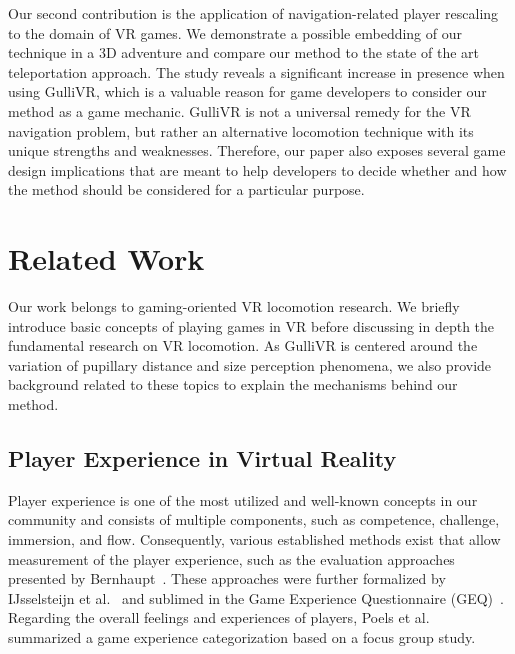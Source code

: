 \documentclass{sigchi}
\begin{document}
Our second contribution is the application of navigation-related player rescaling to the domain of VR games. We demonstrate a possible embedding of our technique in a 3D adventure and compare our method to the state of the art teleportation approach. The study reveals a significant increase in presence when using GulliVR, which is a valuable reason for game developers to consider our method as a game mechanic. GulliVR is not a universal remedy for the VR navigation problem, but rather an alternative locomotion technique with its unique strengths and weaknesses. Therefore, our paper also exposes several game design implications that are meant to help developers to decide whether and how the method should be considered for a particular purpose.




\section{Related Work}

Our work belongs to gaming-oriented VR locomotion research. We briefly introduce basic concepts of playing games in VR before discussing in depth the fundamental research on VR locomotion. As GulliVR is centered around the variation of pupillary distance and size perception phenomena, we also provide background related to these topics to explain the mechanisms behind our method.


\subsection{Player Experience in Virtual Reality}


Player experience is one of the most utilized and well-known concepts in our community and consists of multiple components, such as competence, challenge, immersion, and flow. Consequently, various established methods exist that allow measurement of the player experience, such as the evaluation approaches presented by Bernhaupt~\cite{Bernhaupt2010}. These approaches were further formalized by IJsselsteijn et al.~\cite{ijsselsteijn2007characterising, ijsselsteijn2008measuring} and sublimed in the Game Experience Questionnaire (GEQ)~\cite{IJsselsteijn.2013}. Regarding the overall feelings and experiences of players, Poels et al.~\cite{Poels:2007:ALF:1328202.1328218} summarized a game experience categorization based on a focus group study.
\end{document}
